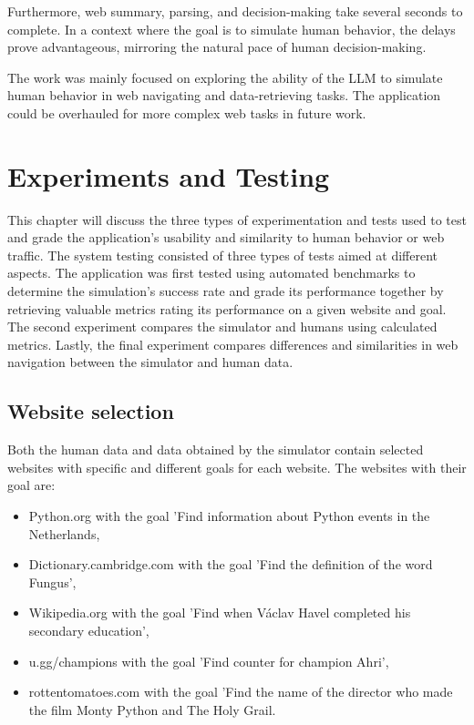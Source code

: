Furthermore, web summary, parsing, and decision-making take several seconds to complete. In a context where the goal is to simulate human behavior, the delays prove advantageous, mirroring the natural pace of human decision-making. 

The work was mainly focused on exploring the ability of the LLM to simulate human behavior in web navigating and data-retrieving tasks. The application could be overhauled for more complex web tasks in future work. 

\chapter{Experiments and Testing}
\label{experiment}

This chapter will discuss the three types of experimentation and tests used to test and grade the application's usability and similarity to human behavior or web traffic. The system testing consisted of three types of tests aimed at different aspects. The application was first tested using automated benchmarks to determine the simulation's success rate and grade its performance together by retrieving valuable metrics rating its performance on a given website and goal. The second experiment compares the simulator and humans using calculated metrics. Lastly, the final experiment compares differences and similarities in web navigation between the simulator and human data. 

\section{Website selection}

Both the human data and data obtained by the simulator contain selected websites with specific and different goals for each website. The websites with their goal are:

\begin{itemize}
    \item Python.org with the goal 'Find information about Python events in the Netherlands,
    \item Dictionary.cambridge.com with the goal 'Find the definition of the word Fungus',
    \item Wikipedia.org with the goal 'Find when Václav Havel completed his secondary education',
    \item u.gg/champions with the goal 'Find counter for champion Ahri',
    \item rottentomatoes.com with the goal 'Find the name of the director who made the film Monty Python and The Holy Grail.
\end{itemize}

